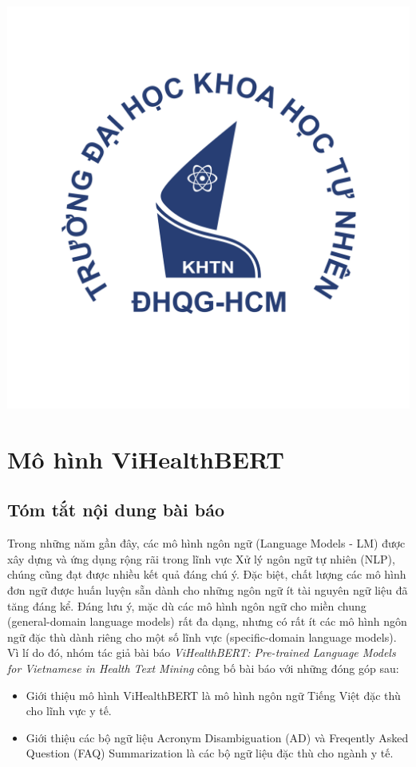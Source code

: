 \documentclass[12pt]{article}
\begin{document}
\begin{titlepage}
\includegraphics[scale=.3]{img/hcmus-logo.png}\\[1cm] 

\vfill
\end{titlepage}


\tableofcontents
\pagebreak

\section{Mô hình ViHealthBERT}
\subsection{Tóm tắt nội dung bài báo}
Trong những năm gần đây, các mô hình ngôn ngữ (Language Models - LM) được xây dựng và ứng dụng rộng rãi trong lĩnh vực Xử lý ngôn ngữ tự nhiên (NLP), chúng cũng đạt được nhiều kết quả đáng chú ý. Đặc biệt, chất lượng các mô hình đơn ngữ được huấn luyện sẵn dành cho những ngôn ngữ ít tài nguyên ngữ liệu đã tăng đáng kể. Đáng lưu ý, mặc dù các mô hình ngôn ngữ cho miền chung (general-domain language models) rất đa dạng, nhưng có rất ít các mô hình ngôn ngữ đặc thù dành riêng cho một số lĩnh vực (specific-domain language models). Vì lí do đó, nhóm tác giả bài báo \textit{ViHealthBERT: Pre-trained Language Models for Vietnamese in Health Text Mining}\cite{minh-EtAl:2022:LREC} công bố bài báo với những đóng góp sau:
\begin{itemize}
\item Giới thiệu mô hình ViHealthBERT là mô hình ngôn ngữ Tiếng Việt đặc thù cho lĩnh vực y tế.
\item Giới thiệu các bộ ngữ liệu Acronym Disambiguation (AD) và Freqently Asked Question (FAQ) Summarization là các bộ ngữ liệu đặc thù cho ngành y tế.
\end{itemize}
\end{document}
